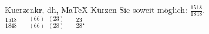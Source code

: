 \begin{MAufgabe}{Kuerzen}{kr, dh, MaTeX}
K\"urzen Sie soweit m\"oglich: $\frac{1518}{1848}$.\\ 
\ifLsg\MLoesung
\quad $\frac{1518}{1848}=\frac{(66)\cdot(23)}{(66)\cdot(28)}=\frac{23}{28}$.\else\relax\fi
 \end{MAufgabe}